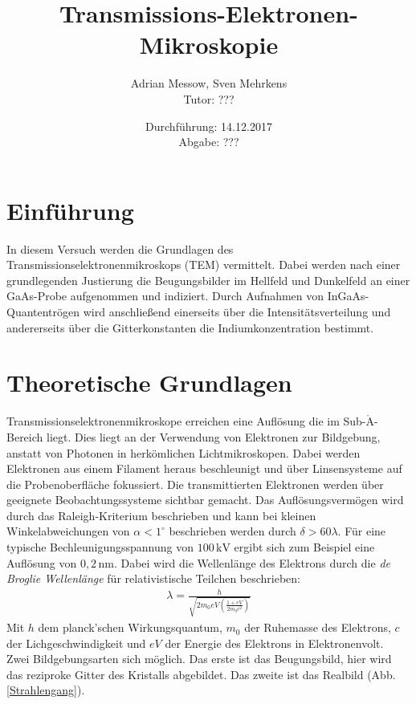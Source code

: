 \documentclass[a4paper,11pt,DIV=11]{scrartcl}
\title{Transmissions-Elektronen-Mikroskopie}
\author{Adrian Messow, Sven Mehrkens \\
Tutor: ???}
\date{Durchführung: 14.12.2017 \\ Abgabe: ??? }
\begin{document}
\maketitle
\section{Einführung}
In diesem Versuch werden die Grundlagen des Transmissionselektronenmikroskops (TEM) vermittelt. Dabei werden nach einer grundlegenden Justierung die Beugungsbilder im Hellfeld und Dunkelfeld an einer GaAs-Probe aufgenommen und indiziert. Durch Aufnahmen von InGaAs-Quantentrögen wird anschließend einerseits über die Intensitätsverteilung und andererseits über die Gitterkonstanten die Indiumkonzentration bestimmt.

\section{Theoretische Grundlagen}
Transmissionselektronenmikroskope erreichen eine Auflösung die im Sub-\(\mathrm{\mathring{A}}\)-Bereich liegt. Dies liegt an der Verwendung von Elektronen zur Bildgebung, anstatt von Photonen in herkömlichen Lichtmikroskopen. Dabei werden Elektronen aus einem Filament heraus beschleunigt und über Linsensysteme auf die Probenoberfläche fokussiert. Die transmittierten Elektronen werden über geeignete Beobachtungssysteme sichtbar gemacht. Das Auflösungsvermögen wird durch das Raleigh-Kriterium beschrieben und kann bei kleinen Winkelabweichungen von \(\alpha<1^\circ\) beschrieben werden durch \(\delta > 60\lambda\). Für eine typische Bechleunigungsspannung von \(100\,\mathrm{kV}\) ergibt sich zum Beispiel eine Auflösung von \(0,2\,\mathrm{nm}\). Dabei wird die Wellenlänge des Elektrons durch die \textit{de Broglie Wellenlänge} für relativistische Teilchen beschrieben: 
\begin{align}
\lambda = \frac{h}{\sqrt{2m_\mathrm{0}eV(\frac{1+eV}{2m_\mathrm{0}c^2})}}
\end{align}
Mit \(h\) dem planck'schen Wirkungsquantum, \(m_\mathrm{0}\) der Ruhemasse des Elektrons, \(c\) der Lichgeschwindigkeit und \(eV\) der Energie des Elektrons in Elektronenvolt.\\
Zwei Bildgebungsarten sich möglich. Das erste ist das Beugungsbild, hier wird das reziproke Gitter des Kristalls abgebildet. Das zweite ist das Realbild (Abb. \ref{Strahlengang}).
\end{document}
